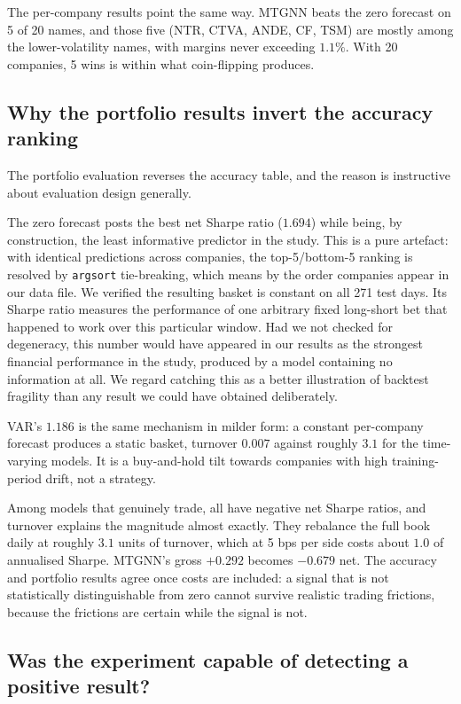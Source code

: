 The per-company results point the same way. MTGNN beats the zero forecast on 5 of 20 names, and those five (NTR, CTVA, ANDE, CF, TSM) are mostly among the lower-volatility names, with margins never exceeding $1.1\%$. With 20 companies, 5 wins is within what coin-flipping produces.

\subsection{Why the portfolio results invert the accuracy ranking}

The portfolio evaluation reverses the accuracy table, and the reason is instructive about evaluation design generally.

The zero forecast posts the best net Sharpe ratio ($1.694$) while being, by construction, the least informative predictor in the study. This is a pure artefact: with identical predictions across companies, the top-5/bottom-5 ranking is resolved by \texttt{argsort} tie-breaking, which means by the order companies appear in our data file. We verified the resulting basket is constant on all 271 test days. Its Sharpe ratio measures the performance of one arbitrary fixed long-short bet that happened to work over this particular window. Had we not checked for degeneracy, this number would have appeared in our results as the strongest financial performance in the study, produced by a model containing no information at all. We regard catching this as a better illustration of backtest fragility \parencite{lopezdeprado2014backtest} than any result we could have obtained deliberately.

VAR's $1.186$ is the same mechanism in milder form: a constant per-company forecast produces a static basket, turnover $0.007$ against roughly $3.1$ for the time-varying models. It is a buy-and-hold tilt towards companies with high training-period drift, not a strategy.

Among models that genuinely trade, all have negative net Sharpe ratios, and turnover explains the magnitude almost exactly. They rebalance the full book daily at roughly $3.1$ units of turnover, which at 5 bps per side costs about $1.0$ of annualised Sharpe. MTGNN's gross $+0.292$ becomes $-0.679$ net. The accuracy and portfolio results agree once costs are included: a signal that is not statistically distinguishable from zero cannot survive realistic trading frictions, because the frictions are certain while the signal is not.

\subsection{Was the experiment capable of detecting a positive result?}

